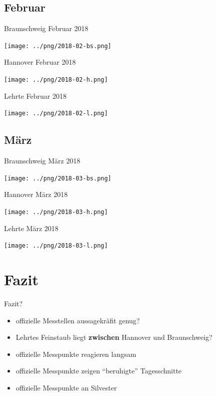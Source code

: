 \documentclass[aspectratio=169]{beamer} %
\begin{document}
\subsection{Februar}
\begin{frame}{Braunschweig Februar 2018}
  \begin{center}
    \texttt{[image: ../png/2018-02-bs.png]}
  \end{center}
\end{frame}
\begin{frame}{Hannover \hspace{4cm} Februar 2018}
  \begin{center}
    \texttt{[image: ../png/2018-02-h.png]}
  \end{center}
\end{frame}
\begin{frame}{Lehrte \hspace{2cm} Februar 2018}
  \begin{center}
    \texttt{[image: ../png/2018-02-l.png]}
  \end{center}
\end{frame}

\subsection{März}
\begin{frame}{Braunschweig März 2018}
  \begin{center}
    \texttt{[image: ../png/2018-03-bs.png]}
  \end{center}
\end{frame}
\begin{frame}{Hannover \hspace{4cm} März 2018}
  \begin{center}
    \texttt{[image: ../png/2018-03-h.png]}
  \end{center}
\end{frame}
\begin{frame}{Lehrte \hspace{2cm} März 2018}
  \begin{center}
    \texttt{[image: ../png/2018-03-l.png]}
  \end{center}
\end{frame}

\section*{Fazit}
\begin{frame}{Fazit?}
  \begin{itemize}
  \item offizielle Messtellen aussagekräfit genug?
  \item Lehrtes Feinstaub liegt \textbf{zwischen} Hannover und Braunschweig?
  \item offizielle Messpunkte reagieren langsam
  \item offizielle Messpunkte zeigen ``beruhigte'' Tagesschnitte
  \item offizielle Messpunkte an Silvester
  \end{itemize}
\end{frame}
\end{document}

